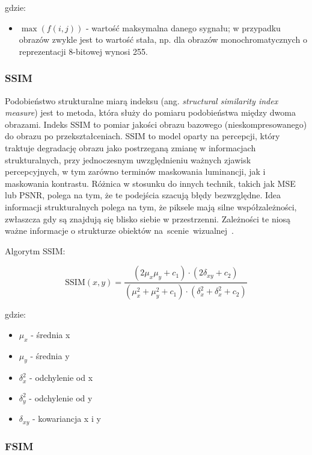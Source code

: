\documentclass{article}
\begin{document}
gdzie:
\begin{itemize}[label=]
  \item $\max(f(i,j))$ - wartość maksymalna danego sygnału; w przypadku obrazów zwykle jest to wartość stała,
        np. dla obrazów monochromatycznych o reprezentacji 8-bitowej wynosi 255.
\end{itemize}

\subsubsection{SSIM}

Podobieństwo strukturalne miarą indeksu (ang. \emph{structural similarity index measure}) jest to metoda, która służy 
do pomiaru podobieństwa między dwoma obrazami. Indeks SSIM to pomiar jakości obrazu bazowego (nieskompresowanego) 
do obrazu po przekształceniach. SSIM to model oparty na percepcji, który traktuje degradację obrazu jako postrzeganą zmianę
w informacjach strukturalnych, przy jednoczesnym uwzględnieniu ważnych zjawisk percepcyjnych, w tym zarówno terminów maskowania 
luminancji, jak i maskowania kontrastu. Różnica w stosunku do innych technik, takich jak MSE lub PSNR,
polega na tym, że te podejścia szacują błędy bezwzględne. Idea informacji strukturalnych polega na tym, że piksele mają silne współzależności,
zwłaszcza gdy są znajdują się blisko siebie w przestrzenni. Zależności te niosą ważne informacje o strukturze obiektów \mbox{na scenie wizualnej \cite{channappayya2008rate}.}

Algorytm SSIM:

\begin{equation}
    \mathrm{SSIM}(x, y) = \frac{(2\mu_{x}\mu_{y} + c_{1}) \cdot (2\delta_{xy} + c_2)}{(\mu_{x}^2 + \mu_{y}^2 + c_{1}) \cdot (\delta_{x}^2 + \delta_{x}^2 + c_2)}
\end{equation}

gdzie:
\begin{itemize}[label=]
  \item $\mu_{x}$ - średnia x
  \item $\mu_{y}$ - średnia y
  \item $\delta_{x}^2$ - odchylenie od x
  \item $\delta_{y}^2$ - odchylenie od y
  \item $\delta_{xy}$ - kowariancja x i y
\end{itemize}

\subsubsection{FSIM}
\end{document}
